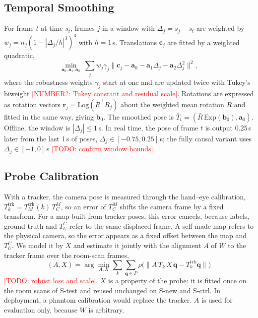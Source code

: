 \documentclass[journal]{IEEEtran}
\newcommand{\tbd}[1]{\textcolor{red}{[TODO: #1]}}
\newcommand{\NUMQ}[1]{\textcolor{red}{[NUMBER?: #1]}}
\newcommand{\Stest}{S-test}
\newcommand{\Snew}{S-new}
\newcommand{\Sctrl}{S-ctrl}
\begin{document}
\subsection{Temporal Smoothing}
\label{sec:smoothing}
For frame $t$ at time $s_t$, frames $j$ in a window with $\Delta_j=s_j-s_t$ are weighted by $w_j=n_j(1-|\Delta_j/h|^3)^3$ with $h=1$\,s. Translations $\mathbf{c}_j$ are fitted by a weighted quadratic,
\begin{equation}
  \min_{\mathbf{a}_0,\mathbf{a}_1,\mathbf{a}_2}\ \sum_j w_j\gamma_j\|\mathbf{c}_j-\mathbf{a}_0-\mathbf{a}_1\Delta_j-\mathbf{a}_2\Delta_j^2\|^2 ,
  \label{eq:smooth}
\end{equation}
where the robustness weights $\gamma_j$ start at one and are updated twice with Tukey's biweight \NUMQ{Tukey constant and residual scale}. Rotations are expressed as rotation vectors $\mathbf{r}_j=\mathrm{Log}(\bar R^\top R_j)$ about the weighted mean rotation $\bar R$ and fitted in the same way, giving $\mathbf{b}_0$. The smoothed pose is $\bar T_t=(\bar R\,\mathrm{Exp}(\mathbf{b}_0),\mathbf{a}_0)$. Offline, the window is $|\Delta_j|\le1$\,s. In real time, the pose of frame $t$ is output 0.25\,s later from the last 1\,s of poses, $\Delta_j\in[-0.75,0.25]$\,s; the fully causal variant uses $\Delta_j\in[-1,0]$\,s \tbd{confirm window bounds}.

\subsection{Probe Calibration}
\label{sec:calib}
With a tracker, the camera pose is measured through the hand--eye calibration, $T^{\mathrm{trk}}_k=T^{\mathrm{trk}}_M(k)\,T^M_C$, so an error of $T^M_C$ shifts the camera frame by a fixed transform. For a map built from tracker poses, this error cancels, because labels, ground truth and $T^C_U$ refer to the same displaced frame. A self-made map refers to the physical camera, so the error appears as a fixed offset between the map and $T^C_U$. We model it by $X$ and estimate it jointly with the alignment $A$ of $W$ to the tracker frame over the room-scan frames,
\begin{equation}
  (A,X)=\arg\min_{A,X}\sum_k\sum_{\mathbf{q}\in P}\rho\big(\|A\,T_k\,X\,\mathbf{q}-T^{\mathrm{trk}}_k\mathbf{q}\|\big)
  \label{eq:calib}
\end{equation}
\tbd{robust loss and scale}. $X$ is a property of the probe: it is fitted once on the room scans of \Stest{} and reused unchanged on \Snew{} and \Sctrl{}. In deployment, a phantom calibration would replace the tracker. $A$ is used for evaluation only, because $W$ is arbitrary.
\end{document}

